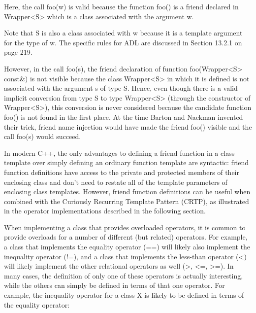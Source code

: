 Here, the call foo(w) is valid because the function foo() is a friend declared in Wrapper<S> which is a class associated with the argument w.

\begin{tcolorbox}[colback=webgreen!5!white,colframe=webgreen!75!black]
\hspace*{0.75cm}Note that S is also a class associated with w because it is a template argument for the type of w. The specific rules for ADL are discussed in Section 13.2.1 on page 219.
\end{tcolorbox}

However, in the call foo(s), the friend declaration of function foo(Wrapper<S> const\&) is not visible because the class Wrapper<S> in which it is defined is not associated with the argument s of type S. Hence, even though there is a valid implicit conversion from type S to type Wrapper<S> (through the constructor of Wrapper<S>), this conversion is never considered because the candidate function foo() is not found in the first place. At the time Barton and Nackman invented their trick, friend name injection would have made the friend foo() visible and the call foo(s) would succeed.

In modern C++, the only advantages to defining a friend function in a class template over simply defining an ordinary function template are syntactic: friend function definitions have access to the private and protected members of their enclosing class and don’t need to restate all of the template parameters of enclosing class templates. However, friend function definitions can be useful when combined with the Curiously Recurring Template Pattern (CRTP), as illustrated in the operator implementations described in the following section.


When implementing a class that provides overloaded operators, it is common to provide overloads for a number of different (but related) operators. For example, a class that implements the equality operator (==) will likely also implement the inequality operator (!=), and a class that implements the less-than operator (<) will likely implement the other relational operators as well (>, <=, >=). In many cases, the definition of only one of these operators is actually interesting, while the others can simply be defined in terms of that one operator. For example, the inequality operator for a class X is likely to be defined in terms of the equality operator:

